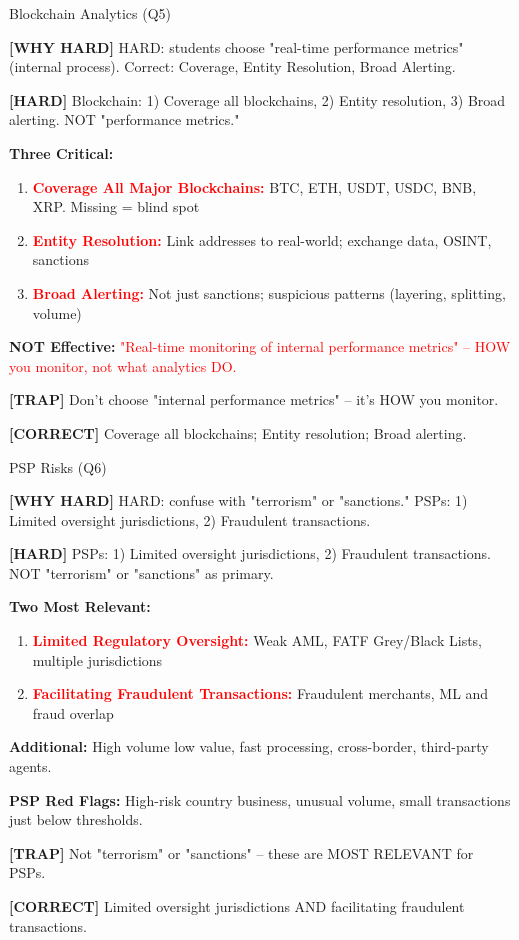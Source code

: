 \documentclass[6pt,aspectratio=169,fontsize=5pt]{beamer}
\renewcommand{\tiny}{\fontsize{3.5pt}{4.5pt}\selectfont}
\renewcommand{\normalsize}{\fontsize{7.5pt}{8.5pt}\selectfont}
\newcommand{\trap}[1]{%
	\begin{block}{\textcolor{redtrap}{\textbf{[TRAP]}}}
		\textcolor{redtrap}{\tiny #1}
	\end{block}
}
\newcommand{\correct}[1]{%
	\begin{block}{\textcolor{greencorrect}{\textbf{[CORRECT]}}}
		\textcolor{greencorrect}{\tiny #1}
	\end{block}
}
\newcommand{\hard}[1]{%
	\begin{block}{\textcolor{hardcolor}{\textbf{[HARD]}}}
		\textcolor{hardcolor}{\tiny #1}
	\end{block}
}
\newcommand{\hardexplain}[1]{%
	\begin{block}{\textcolor{orangehard}{\textbf{[WHY HARD]}}}
		\textcolor{orangehard}{\tiny #1}
	\end{block}
}
\begin{document}
	\begin{frame}{\normalsize Blockchain Analytics (Q5)}
		
		\hardexplain{HARD: students choose "real-time performance metrics" (internal process). Correct: Coverage, Entity Resolution, Broad Alerting.}
		
		\hard{Blockchain: 1) Coverage all blockchains, 2) Entity resolution, 3) Broad alerting. NOT "performance metrics."}
		
		\textbf{Three Critical:}
		\begin{enumerate}
			\item \textcolor{red}{\textbf{Coverage All Major Blockchains:}} BTC, ETH, USDT, USDC, BNB, XRP. Missing = blind spot
			\item \textcolor{red}{\textbf{Entity Resolution:}} Link addresses to real-world; exchange data, OSINT, sanctions
			\item \textcolor{red}{\textbf{Broad Alerting:}} Not just sanctions; suspicious patterns (layering, splitting, volume)
		\end{enumerate}
		
		\textbf{NOT Effective:} \textcolor{red}{"Real-time monitoring of internal performance metrics" -- HOW you monitor, not what analytics DO.}
		
		\trap{Don't choose "internal performance metrics" -- it's HOW you monitor.}
		
		\correct{Coverage all blockchains; Entity resolution; Broad alerting.}
	\end{frame}
	
	\begin{frame}{\normalsize PSP Risks (Q6)}
		
		\hardexplain{HARD: confuse with "terrorism" or "sanctions." PSPs: 1) Limited oversight jurisdictions, 2) Fraudulent transactions.}
		
		\hard{PSPs: 1) Limited oversight jurisdictions, 2) Fraudulent transactions. NOT "terrorism" or "sanctions" as primary.}
		
		\textbf{Two Most Relevant:}
		\begin{enumerate}
			\item \textcolor{red}{\textbf{Limited Regulatory Oversight:}} Weak AML, FATF Grey/Black Lists, multiple jurisdictions
			\item \textcolor{red}{\textbf{Facilitating Fraudulent Transactions:}} Fraudulent merchants, ML and fraud overlap
		\end{enumerate}
		
		\textbf{Additional:} High volume low value, fast processing, cross-border, third-party agents.
		
		\textbf{PSP Red Flags:} High-risk country business, unusual volume, small transactions just below thresholds.
		
		\trap{Not "terrorism" or "sanctions" -- these are MOST RELEVANT for PSPs.}
		
		\correct{Limited oversight jurisdictions AND facilitating fraudulent transactions.}
	\end{frame}
	
\end{document}
